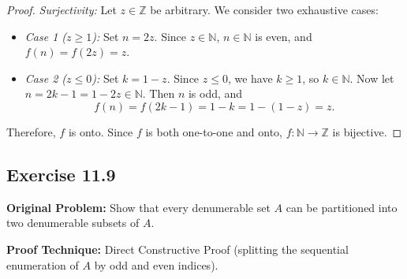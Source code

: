 \documentclass[11pt, letterpaper]{article}
\theoremstyle{definition}
\theoremstyle{remark}
\begin{document}
\begin{proof}
\emph{Surjectivity:} Let $z \in \mathbb{Z}$ be arbitrary. We consider two exhaustive cases:
\begin{itemize}
    \item \emph{Case 1 ($z \ge 1$):} Set $n = 2z$. Since $z \in \mathbb{N}$, $n \in \mathbb{N}$ is even, and $f(n) = f(2z) = z$.
    \item \emph{Case 2 ($z \le 0$):} Set $k = 1 - z$. Since $z \le 0$, we have $k \ge 1$, so $k \in \mathbb{N}$. Now let $n = 2k - 1 = 1 - 2z \in \mathbb{N}$. Then $n$ is odd, and
    \[
    f(n) = f(2k - 1) = 1 - k = 1 - (1 - z) = z.
    \]
\end{itemize}
Therefore, $f$ is onto. Since $f$ is both one-to-one and onto, $f : \mathbb{N} \to \mathbb{Z}$ is bijective.
\end{proof}

\subsection{Exercise 11.9}

\textbf{Original Problem:} Show that every denumerable set $A$ can be partitioned into two denumerable subsets of $A$.

\textbf{Proof Technique:} Direct Constructive Proof (splitting the sequential enumeration of $A$ by odd and even indices).
\end{document}
